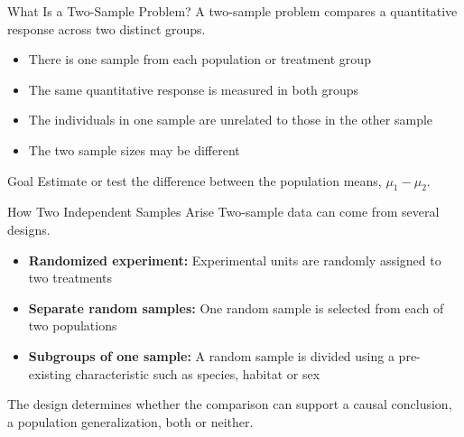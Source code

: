 \documentclass[aspectratio=169,10pt]{beamer}
\begin{document}
\begin{frame}{What Is a Two-Sample Problem?}
A two-sample problem compares a quantitative response across two distinct groups.

\begin{itemize}
  \item There is one sample from each population or treatment group
  \item The same quantitative response is measured in both groups
  \item The individuals in one sample are unrelated to those in the other sample
  \item The two sample sizes may be different
\end{itemize}

\begin{block}{Goal}
Estimate or test the difference between the population means, $\mu_1-\mu_2$.
\end{block}
\end{frame}

\begin{frame}{How Two Independent Samples Arise}
Two-sample data can come from several designs.

\begin{itemize}
  \item \textbf{Randomized experiment:} Experimental units are randomly assigned to two treatments
  \item \textbf{Separate random samples:} One random sample is selected from each of two populations
  \item \textbf{Subgroups of one sample:} A random sample is divided using a pre-existing characteristic such as species, habitat or sex
\end{itemize}

The design determines whether the comparison can support a causal conclusion, a population generalization, both or neither.
\end{frame}
\end{document}
